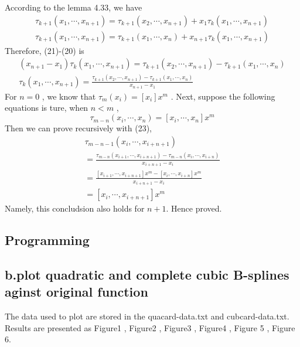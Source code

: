 \documentclass[twoside,a4paper]{article}
\begin{document}
According to the lemma 4.33, we have  
\begin{gather}
\tau_{k+1}(x_1,\cdots,x_{n+1})
=\tau_{k+1}(x_2,\cdots,x_{n+1})+x_1\tau_k(x_1,\cdots,x_{n+1})\\
\tau_{k+1}(x_1,\cdots,x_{n+1})
=\tau_{k+1}(x_1,\cdots,x_{n})+x_{n+1}\tau_k(x_1,\cdots,x_{n+1})
\end{gather}
Therefore, (21)-(20) is
\begin{gather}
(x_{n+1}-x_1)\tau_k(x_1,\cdots,x_{n+1})=\tau_{k+1}(x_2,\cdots,x_{n+1})-\tau_{k+1}(x_1,\cdots,x_n)\\
\tau_k(x_1,\cdots,x_{n+1})=\frac{\tau_{k+1}(x_2,\cdots,x_{n+1})-\tau_{k+1}(x_1,\cdots,x_n)}{x_{n+1}-x_1}
\end{gather}
For $n=0$ , we know that $\tau_m(x_i)=[x_i]x^m$ . Next, suppose the following equations is ture, when $n<m$ , 
\[
\tau_{m-n}(x_i,\cdots,x_{n})=[x_i,\cdots,x_n]x^m
\]
Then we can prove recursively with (23),
\begin{gather}
\tau_{m-n-1}(x_i,\cdots,x_{i+n+1})\\
=\frac{\tau_{m-n}(x_{i+1},\cdots,x_{i+n+1})-\tau_{m-n}(x_i,\cdots,x_{i+n})}{x_{i+n+1}-x_i}\\
=\frac{[x_{i+1},\cdots,x_{i+n+1}]x^m-[x_i,\cdots,x_{i+n}]x^m}{x_{i+n+1}-x_i}\\
=[x_i,\cdots,x_{i+n+1}]x^m
\end{gather}
Namely, this concludsion also holds for $n+1$. Hence proved.

\subsection*{Programming}
\subsection*{b.plot quadratic and complete cubic B-splines aginst original function}
The data used to plot are stored in the quacard-data.txt  and cubcard-data.txt. Results are presented as Figure1 , Figure2 , Figure3 , Figure4 , Figure 5 , Figure 6. 
\end{document}
